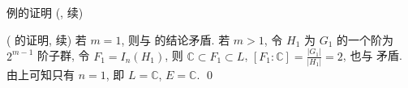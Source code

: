 
\begin{frame}{例的证明 (\texorpdfstring{}{3}, 续)}

\startproof[bg=yellow, fg=red]( 的证明, 续)
若 $m = 1$, 则与  的结论矛盾.
若 $m > 1$, 令 $H_1$ 为 $G_1$ 的一个阶为 $2^{m-1}$ 阶子群,
令 $F_1 = I_n(H_1)$, 则 $\mathbb{C} \subset F_1 \subset L$,
$[F_1:\mathbb{C}] = \frac{|G_1|}{|H_1|} = 2$, 也与  矛盾.
由上可知只有 $n = 1$, 即 $L = \mathbb{C}$, $E = \mathbb{C}$.
\qed

\end{frame}



